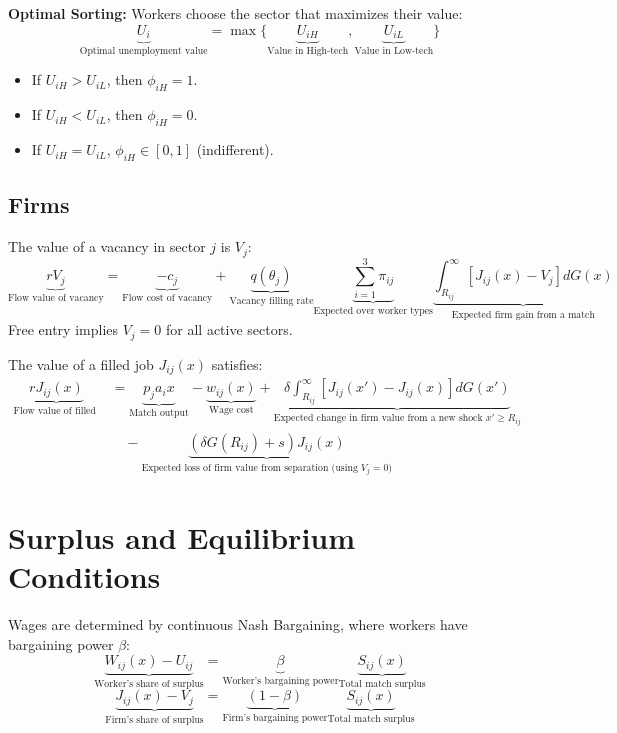 \documentclass[11pt]{article}
\begin{document}
\textbf{Optimal Sorting:} Workers choose the sector that maximizes their value:
\begin{equation}
\underbrace{U_i}_{\text{Optimal unemployment value}} = \max \{ \underbrace{U_{iH}}_{\text{Value in High-tech}}, \underbrace{U_{iL}}_{\text{Value in Low-tech}} \}
\end{equation}
\begin{itemize}
    \item If $U_{iH} > U_{iL}$, then $\phi_{iH} = 1$.
    \item If $U_{iH} < U_{iL}$, then $\phi_{iH} = 0$.
    \item If $U_{iH} = U_{iL}$, $\phi_{iH} \in [0, 1]$ (indifferent).
\end{itemize}

\subsection{Firms}
The value of a vacancy in sector $j$ is $V_j$:
\begin{equation}
\underbrace{r V_j}_{\text{Flow value of vacancy}} = \underbrace{-c_j}_{\text{Flow cost of vacancy}} + \underbrace{q(\theta_j)}_{\text{Vacancy filling rate}} \underbrace{\sum_{i=1}^3 \pi_{ij}}_{\text{Expected over worker types}} \underbrace{\int_{R_{ij}}^\infty [J_{ij}(x) - V_j] dG(x)}_{\text{Expected firm gain from a match}}
\end{equation}
Free entry implies $V_j = 0$ for all active sectors.

The value of a filled job $J_{ij}(x)$ satisfies:
\begin{equation}
\begin{aligned}
\underbrace{r J_{ij}(x)}_{\text{Flow value of filled job}} &= \underbrace{p_j a_i x}_{\text{Match output}} - \underbrace{w_{ij}(x)}_{\text{Wage cost}} + \underbrace{\delta \int_{R_{ij}}^\infty [J_{ij}(x') - J_{ij}(x)] dG(x')}_{\text{Expected change in firm value from a new shock $x' \ge R_{ij}$}} \\
&\quad - \underbrace{(\delta G(R_{ij}) + s) J_{ij}(x)}_{\text{Expected loss of firm value from separation (using $V_j=0$)}}
\end{aligned}
\end{equation}

\section{Surplus and Equilibrium Conditions}
Wages are determined by continuous Nash Bargaining, where workers have bargaining power $\beta$:
\begin{equation}
\underbrace{W_{ij}(x) - U_{ij}}_{\text{Worker's share of surplus}} = \underbrace{\beta}_{\text{Worker's bargaining power}} \underbrace{S_{ij}(x)}_{\text{Total match surplus}}
\end{equation}
\begin{equation}
\underbrace{J_{ij}(x) - V_j}_{\text{Firm's share of surplus}} = \underbrace{(1-\beta)}_{\text{Firm's bargaining power}} \underbrace{S_{ij}(x)}_{\text{Total match surplus}}
\end{equation}
\end{document}
